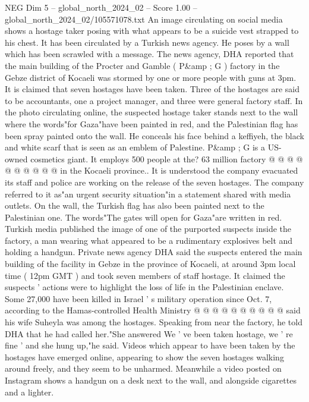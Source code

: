 \begin{textsample}{NEG Dim 5 – global\_north\_2024\_02 – Score 1.00 – global\_north\_2024\_02/105571078.txt}  \label{ex:f5_neg_217}
An image circulating on social media shows a hostage taker posing with what appears to be a suicide vest strapped to his chest.
It has been circulated by a Turkish news agency.
He poses by a wall which has been scrawled with a message.
The news agency, DHA reported that the main building of the Procter and Gamble ( P\&amp ; G ) factory in the Gebze district of Kocaeli was stormed by one or more people with guns at 3pm.
It is claimed that seven hostages have been taken.
Three of the hostages are said to be accountants, one a project manager, and three were general factory staff.
In the photo circulating online, the suspected hostage taker stands next to the wall where the words"for Gaza"have been painted in red, and the Palestinian flag has been spray painted onto the wall.
He conceals his face behind a keffiyeh, the black and white scarf that is seen as an emblem of Palestine.
P\&amp ; G is a US-owned cosmetics giant.
It employs 500 people at the? 63 million factory @ @ @ @ @ @ @ @ @ @ in the Kocaeli province..
It is understood the company evacuated its staff and police are working on the release of the seven hostages.
The company referred to it as"an urgent security situation"in a statement shared with media outlets.
On the wall, the Turkish flag has also been painted next to the Palestinian one.
The words"The gates will open for Gaza"are written in red.
Turkish media published the image of one of the purported suspects inside the factory, a man wearing what appeared to be a rudimentary explosives belt and holding a handgun.
Private news agency DHA said the suspects entered the main building of the facility in Gebze in the province of Kocaeli, at around 3pm local time ( 12pm GMT ) and took seven members of staff hostage.
It claimed the suspects ' actions were to highlight the loss of life in the Palestinian enclave.
Some 27,000 have been killed in Israel ' s military operation since Oct. 7, according to the Hamas-controlled Health Ministry @ @ @ @ @ @ @ @ @ @ said his wife Suheyla was among the hostages.
Speaking from near the factory, he told DHA that he had called her."She answered We ' ve been taken hostage, we ' re fine ' and she hung up,"he said.
Videos which appear to have been taken by the hostages have emerged online, appearing to show the seven hostages walking around freely, and they seem to be unharmed.
Meanwhile a video posted on Instagram shows a handgun on a desk next to the wall, and alongside cigarettes and a lighter.

\end{textsample}

